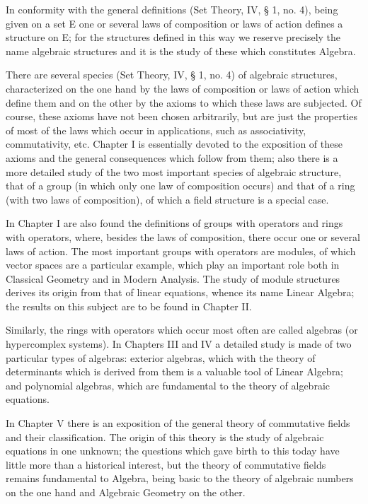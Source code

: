 In conformity with the general definitions (Set Theory, IV, § 1, no. 4), being given on a set E one or several laws of composition or laws of action defines a structure on E; for the structures defined in this way we reserve precisely the name algebraic structures and it is the study of these which constitutes Algebra.

There are several species (Set Theory, IV, § 1, no. 4) of algebraic structures, characterized on the one hand by the laws of composition or laws of action which define them and on the other by the axioms to which these laws are subjected. Of course, these axioms have not been chosen arbitrarily, but are just the properties of most of the laws which occur in applications, such as associativity, commutativity, etc. Chapter I is essentially devoted to the exposition of these axioms and the general consequences which follow from them; also there is a more detailed study of the two most important species of algebraic structure, that of a group (in which only one law of composition occurs) and that of a ring (with two laws of composition), of which a field structure is a special case.

In Chapter I are also found the definitions of groups with operators and rings with operators, where, besides the laws of composition, there occur one or several laws of action. The most important groups with operators are modules, of which vector spaces are a particular example, which play an important role both in Classical Geometry and in Modern Analysis. The study of module structures derives its origin from that of linear equations, whence its name Linear Algebra; the results on this subject are to be found in Chapter II.

Similarly, the rings with operators which occur most often are called algebras (or hypercomplex systems). In Chapters III and IV a detailed study is made of two particular types of algebras: exterior algebras, which with the theory of determinants which is derived from them is a valuable tool of Linear Algebra; and polynomial algebras, which are fundamental to the theory of algebraic equations.

In Chapter V there is an exposition of the general theory of commutative fields and their classification. The origin of this theory is the study of algebraic equations in one unknown; the questions which gave birth to this today have little more than a historical interest, but the theory of commutative fields remains fundamental to Algebra, being basic to the theory of algebraic numbers on the one hand and Algebraic Geometry on the other.

